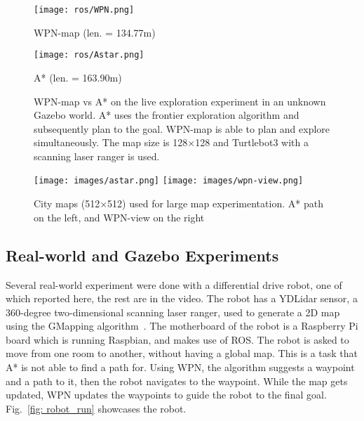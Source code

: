 \documentclass[journal, twocolumn]{IEEEtran}
\begin{document}
\begin{figure}
\begin{minipage}{.48\columnwidth}
  \centering
  \texttt{[image: ros/WPN.png]}
  \caption*{WPN-map (len. = 134.77m)}
  \label{fig:test1}
\end{minipage}%
\hspace{1pt}
\begin{minipage}{.48\columnwidth}
  \centering
  \texttt{[image: ros/Astar.png]}
  \caption*{A* (len. = 163.90m)}
  \label{fig:test2}
\end{minipage}
\vspace{-2 mm}
\caption{WPN-map vs A* on the live exploration experiment in an unknown Gazebo world. A* uses the frontier exploration algorithm and subsequently plan to the goal. WPN-map is able to plan and explore simultaneously. The map size is 128$\times$128 and Turtlebot3 with a scanning laser ranger is used. }
  \vspace{-3 mm}
  \label{fig:ros-exploration}  
  \end{figure}
\vspace{-1 mm}

\begin{figure}[t]
\centering
    \texttt{[image: images/astar.png]}
    \texttt{[image: images/wpn-view.png]}

  \vspace{1mm}
\caption{City maps (512$\times$512) used for large map experimentation. A* path on the left, and WPN-view on the right}
  \label{fig:largemaps}  
  \vspace{-2 mm}
  \end{figure}
\subsection{Real-world and Gazebo Experiments}
Several real-world experiment were done with a differential drive robot, one of which reported here, the rest are in the video. The robot has a YDLidar sensor, a 360-degree two-dimensional scanning laser ranger, used to generate a 2D map using the GMapping algorithm~\cite{gmapping}. The motherboard of the robot is a Raspberry Pi board which is running Raspbian, and makes use of ROS. The robot is asked to move from one room to another, without having a global map. This is a task that A* is not able to find a path for. Using WPN, the algorithm suggests a waypoint and a path to it, then the robot navigates to the waypoint. While the map gets updated, WPN updates the waypoints to guide the robot to the final goal. Fig.~\ref{fig: robot_run} showcases the robot.
\end{document}
